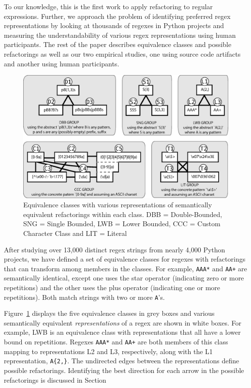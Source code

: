 To our knowledge, this is the first work to apply refactoring to regular expressions. Further, we approach the problem of identifying preferred regex representations by looking at thousands of regexes in Python projects and measuring the understandability of various regex representations using human participants. The rest of the paper describes
equivalence classes and possible refactorings as well as our two empirical studies, one using source code artifacts and another using human participants.

\begin{figure}[tb]
\centering
\includegraphics[width=\textwidth]{nontex/illustrations/refactoringTree.eps}
\vspace{-12pt}
\caption{Equivalence classes with various representations of semantically equivalent refactorings within each class. DBB = Double-Bounded, SNG = Single Bounded, LWB = Lower Bounded, CCC = Custom Character Class and LIT = Literal}
\vspace{-6pt}
\label{fig:refactoringTree}
\end{figure}

After studying over 13,000 distinct regex strings from nearly 4,000 Python projects, we have defined a set of equivalence classes for regexes with refactorings that can transform among members in the classes.
For example,  \verb!AAA*! and \verb!AA+! are semantically identical, except one uses the star operator (indicating zero or more repetitions) and the other uses the plus operator (indicating one or more repetitions).
Both match strings with two or more \verb!A!'s.

Figure~\ref{fig:refactoringTree} displays the five equivalence classes in grey boxes and various semantically equivalent \emph{representations} of a regex are shown in white boxes. For example, LWB is an equivalence class with representations that all have a lower bound on repetitions. Regexes \verb!AAA*! and \verb!AA+!  are both members of this class mapping to representations L2 and L3, respectively, along with the L1 representation, \verb!A{2,}!.
The undirected edges between the representations define possible refactorings.
Identifying the best direction for each arrow in the possible refactorings is discussed in Section


